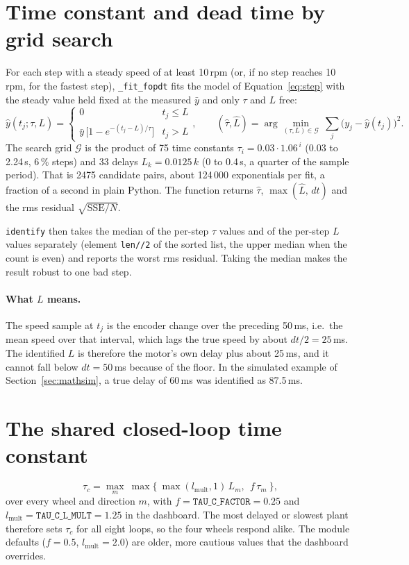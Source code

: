 \documentclass[11pt,a4paper]{report}
\newcommand{\code}[1]{\texttt{#1}}
\begin{document}
\section{Time constant and dead time by grid search}\label{sec:ident-fit}
For each step with a steady speed of at least 10\,rpm (or, if no step reaches 10\,rpm, for the fastest step), \code{\_fit\_fopdt} fits the model of Equation~\eqref{eq:step} with the steady value held fixed at the measured $\bar y$ and only $\tau$ and $L$ free:
\begin{equation}
  \hat y(t_j;\tau,L)=\begin{cases}0 & t_j\le L\\ \bar y\,\bigl[1-e^{-(t_j-L)/\tau}\bigr] & t_j>L\end{cases},\qquad
  (\hat\tau,\hat L)=\arg\min_{(\tau,L)\in\mathcal G}\ \sum_j\bigl(y_j-\hat y(t_j)\bigr)^2 .
\end{equation}
The search grid $\mathcal G$ is the product of 75 time constants $\tau_i=0.03\cdot1.06^{\,i}$ (0.03 to 2.24\,s, 6\,\% steps) and 33 delays $L_k=0.0125\,k$ (0 to 0.4\,s, a quarter of the sample period). That is 2475 candidate pairs, about 124\,000 exponentials per fit, a fraction of a second in plain Python. The function returns $\hat\tau$, $\max(\hat L,\,dt)$ and the rms residual $\sqrt{\mathrm{SSE}/N}$.

\code{identify} then takes the median of the per-step $\tau$ values and of the per-step $L$ values separately (element \code{len//2} of the sorted list, the upper median when the count is even) and reports the worst rms residual. Taking the median makes the result robust to one bad step.

\paragraph{What $L$ means.} The speed sample at $t_j$ is the encoder change over the preceding 50\,ms, i.e.\ the mean speed over that interval, which lags the true speed by about $dt/2=25$\,ms. The identified $L$ is therefore the motor's own delay plus about 25\,ms, and it cannot fall below $dt=50$\,ms because of the floor. In the simulated example of Section~\ref{sec:mathsim}, a true delay of 60\,ms was identified as 87.5\,ms.

\section{The shared closed-loop time constant}\label{sec:commontc}
\begin{equation}
  \tau_c=\max_{m}\ \max\bigl\{\ \max(l_{\text{mult}},1)\,L_m,\ \ f\,\tau_m\ \bigr\},
\end{equation}
over every wheel and direction $m$, with $f=\texttt{TAU\_C\_FACTOR}=0.25$ and $l_{\text{mult}}=\texttt{TAU\_C\_L\_MULT}=1.25$ in the dashboard. The most delayed or slowest plant therefore sets $\tau_c$ for all eight loops, so the four wheels respond alike. The module defaults ($f=0.5$, $l_{\text{mult}}=2.0$) are older, more cautious values that the dashboard overrides.
\end{document}
